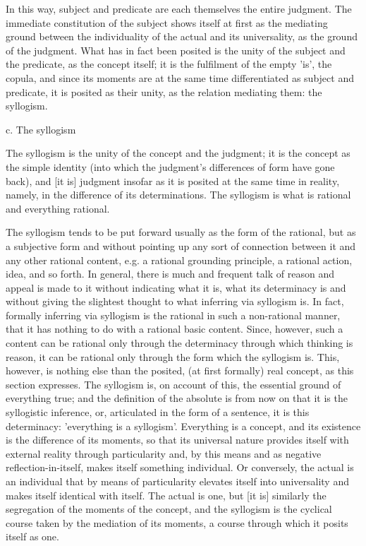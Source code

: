 In this way, subject and predicate are
each themselves the entire judgment.
The immediate constitution of the subject
shows itself at first as the mediating ground
between the individuality of the actual and its universality,
as the ground of the judgment.
What has in fact been posited is
the unity of the subject and the predicate,
as the concept itself;
it is the fulfilment of the empty 'is', the copula,
and since its moments are at the same time
differentiated as subject and predicate,
it is posited as their unity,
as the relation mediating them:
the syllogism.

c. The syllogism

The syllogism is the unity of the concept and the judgment;
it is the concept as the simple identity
(into which the judgment's differences of form have gone back),
and [it is] judgment insofar as it is posited
at the same time in reality,
namely, in the difference of its determinations.
The syllogism is what is rational
and everything rational.

The syllogism tends to be put forward usually
as the form of the rational,
but as a subjective form and without pointing up
any sort of connection between it
and any other rational content, e.g.
a rational grounding principle, a rational action, idea, and so forth.
In general, there is much and frequent talk of reason
and appeal is made to it without indicating what it is,
what its determinacy is and without giving the slightest thought
to what inferring via syllogism is.
In fact, formally inferring via syllogism is
the rational in such a non-rational manner,
that it has nothing to do with a rational basic content.
Since, however, such a content can be rational
only through the determinacy through which thinking is reason,
it can be rational only through the form which the syllogism is.
This, however, is nothing else than
the posited, (at first formally) real concept,
as this section expresses.
The syllogism is, on account of this,
the essential ground of everything true;
and the definition of the absolute is from now on
that it is the syllogistic inference,
or, articulated in the form of a sentence,
it is this determinacy:
'everything is a syllogism'.
Everything is a concept,
and its existence is the difference of its moments,
so that its universal nature provides itself
with external reality through particularity
and, by this means and as negative reflection-in-itself,
makes itself something individual.
Or conversely, the actual is an individual
that by means of particularity
elevates itself into universality
and makes itself identical with itself.
The actual is one, but [it is] similarly
the segregation of the moments of the concept,
and the syllogism is the cyclical course
taken by the mediation of its moments,
a course through which it posits itself as one.


